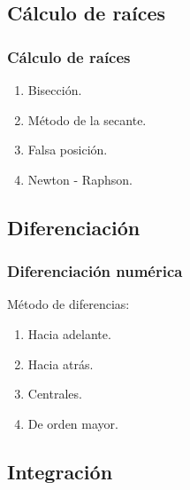 \documentclass[12pt]{beamer}
\begin{document}
\subsection*{Cálculo de raíces}

\begin{frame}
\frametitle{Cálculo de raíces}
\begin{enumerate}[<+->]
\item Bisección.
\item Método de la secante.
\item Falsa posición.
\item Newton - Raphson.
\end{enumerate}
\end{frame}

\subsection*{Diferenciación}

\begin{frame}
\frametitle{Diferenciación numérica}
Método de diferencias:
\begin{enumerate}[<+->]
\item Hacia adelante.
\item Hacia atrás.
\item Centrales.
\item De orden mayor.
\end{enumerate}
\end{frame}

\subsection*{Integración}
\end{document}
